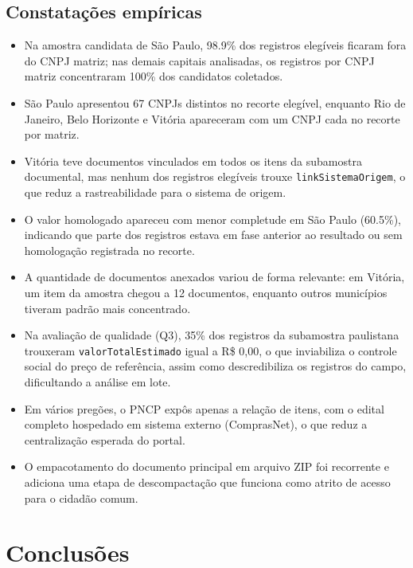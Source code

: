 \documentclass[12pt]{article}
\providecommand{\tightlist}{%
  \setlength{\itemsep}{0pt}\setlength{\parskip}{0pt}}
\begin{document}
\subsection{Constatações
empíricas}\label{constatauxe7uxf5es-empuxedricas}

\begin{itemize}
\tightlist
\item
  Na amostra candidata de São Paulo, 98.9\% dos registros elegíveis
  ficaram fora do CNPJ matriz; nas demais capitais analisadas, os
  registros por CNPJ matriz concentraram 100\% dos candidatos coletados.
\item
  São Paulo apresentou 67 CNPJs distintos no recorte elegível, enquanto
  Rio de Janeiro, Belo Horizonte e Vitória apareceram com um CNPJ cada
  no recorte por matriz.
\item
  Vitória teve documentos vinculados em todos os itens da subamostra
  documental, mas nenhum dos registros elegíveis trouxe
  \texttt{linkSistemaOrigem}, o que reduz a rastreabilidade para o
  sistema de origem.
\item
  O valor homologado apareceu com menor completude em São Paulo
  (60.5\%), indicando que parte dos registros estava em fase anterior ao
  resultado ou sem homologação registrada no recorte.
\item
  A quantidade de documentos anexados variou de forma relevante: em
  Vitória, um item da amostra chegou a 12 documentos, enquanto outros
  municípios tiveram padrão mais concentrado.
\item
  Na avaliação de qualidade (Q3), 35\% dos registros da subamostra
  paulistana trouxeram \texttt{valorTotalEstimado} igual a R\$ 0,00, o
  que inviabiliza o controle social do preço de referência, assim como descredibiliza os registros do campo,
  dificultando a análise em lote.
\item
  Em vários pregões, o PNCP expôs apenas a relação de itens, com o edital
  completo hospedado em sistema externo (ComprasNet), o que reduz a
  centralização esperada do portal.
\item
  O empacotamento do documento principal em arquivo ZIP foi recorrente e
  adiciona uma etapa de descompactação que funciona como atrito de acesso
  para o cidadão comum.
\end{itemize}

\section{Conclusões}\label{conclusuxf5es}
\end{document}
